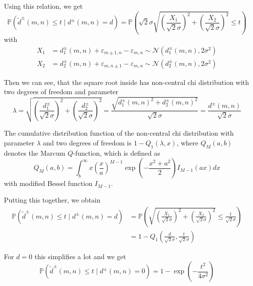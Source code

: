 \documentclass{beamer}
\begin{document}
\begin{frame}
	Using this relation, we get
	\begin{equation*}
		\mathbb{P}(\tilde{d}^\pm(m, n) \leq t \mid d^\pm(m, n) = d) = \mathbb{P}\left( \sqrt{2} \sigma \sqrt{\left( \frac{X_1}{\sqrt{2} \sigma} \right)^2 + \left( \frac{X_2}{\sqrt{2} \sigma} \right)^2} \leq t \right)
	\end{equation*}
	with
	\begin{align*}
		X_1 &= d_1^\pm(m, n) + \varepsilon_{m \pm 1, n} - \varepsilon_{m, n} \sim \mathcal{N}(d_1^\pm(m, n), 2 \sigma^2) \\
		X_2 &= d_2^\pm(m, n) + \varepsilon_{m, n \pm 1} - \varepsilon_{m, n} \sim \mathcal{N}(d_2^\pm(m, n), 2 \sigma^2)
	\end{align*}
	
	Then we can see, that the square root inside has non-central chi distribution with two degrees of freedom and parameter
	\begin{equation*}
		\lambda = \sqrt{\left( \frac{d_1^\pm}{\sqrt{2} \sigma} \right)^2 + \left( \frac{d_2^\pm}{\sqrt{2} \sigma} \right)^2} = \frac{\sqrt{d_1^\pm(m, n)^2 + d_2^\pm(m, n)^2}}{\sqrt{2} \sigma} = \frac{d^\pm(m, n)}{\sqrt{2} \sigma}
	\end{equation*}
\end{frame}

\begin{frame}
	The cumulative distribution function of the non-central chi distribution with parameter $\lambda$ and two degrees of freedom is $1 - Q_1(\lambda, x)$, where $Q_M(a, b)$ denotes the Marcum $Q$-function, which is defined as
	\begin{equation*}
		Q_M(a, b) = \int_b^\infty x \left( \frac{x}{a} \right)^{M-1} \exp \left( - \frac{x^2 + a^2}{2} \right) I_{M-1}(ax) dx
	\end{equation*}
	with modified Bessel function $I_{M-1}$.
	
	Putting this together, we obtain
	\begin{align*}
		\mathbb{P}(\tilde{d}^\pm(m, n) \leq t \mid d^\pm(m, n) = d) &= \mathbb{P}\left( \sqrt{\left( \frac{X_1}{\sqrt{2} \sigma} \right)^2 + \left( \frac{X_2}{\sqrt{2} \sigma} \right)^2} \leq \frac{t}{\sqrt{2} \sigma} \right) \\
		&= 1 - Q_1 \left( \frac{d}{\sqrt{2} \sigma}, \frac{t}{\sqrt{2} \sigma} \right)
	\end{align*}
	
	For $d = 0$ this simplifies a lot and we get
	\begin{equation*}
		\mathbb{P}(\tilde{d}^\pm(m, n) \leq t \mid d^\pm(m, n) = 0) = 1 - \exp \left( - \frac{t^2}{4 \sigma^2} \right)
	\end{equation*}
\end{frame}
\end{document}
